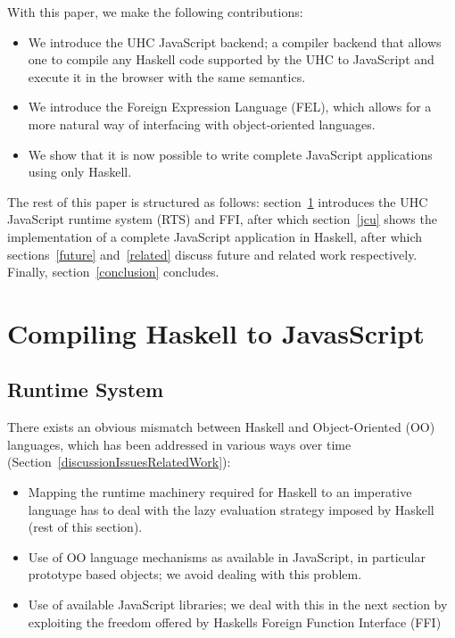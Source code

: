 \documentclass{llncs}
\begin{document}
With this paper, we make the following contributions:

\begin{itemize}
  \item We introduce the UHC JavaScript backend; a compiler backend that allows
    one to compile any Haskell code supported by the UHC to JavaScript and
    execute it in the browser with the same semantics.
  \item We introduce the Foreign Expression Language (FEL), which allows for a
    more natural way of interfacing with object-oriented languages.
  \item We show that it is now possible to write complete JavaScript
    applications using only Haskell.
\end{itemize}

The rest of this paper is structured as follows: section~\ref{hs2js} introduces
the UHC JavaScript runtime system (RTS) and FFI, after which section~\ref{jcu}
shows the implementation of a complete JavaScript application in Haskell, after
which sections~\ref{future} and~\ref{related} discuss future and related work
respectively. Finally, section~\ref{conclusion} concludes.

\section{Compiling Haskell to JavasScript}

\label{hs2js}

\subsection{\label{rts}Runtime System}
There exists an obvious mismatch between Haskell and Object-Oriented (OO) languages,
which has been addressed in various ways over time (Section~\ref{discussionIssuesRelatedWork}):
\begin{itemize}
\item
 Mapping the runtime machinery required for Haskell to an imperative language has to deal with the lazy evaluation strategy
 imposed by Haskell (rest of this section).
\item
 Use of OO language mechanisms as available in JavaScript, in particular prototype based objects; we avoid dealing with this problem.
\item
 Use of available JavaScript libraries;
 we deal with this in the next section by exploiting the freedom offered by Haskells Foreign Function Interface (FFI)
\end{itemize}
\end{document}
